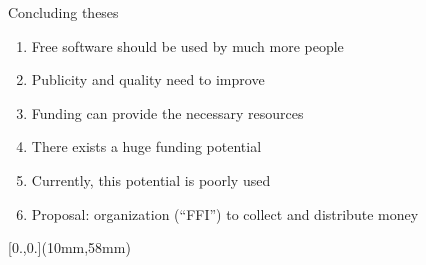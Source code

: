 \documentclass[t]{beamer}
\newcommand{\cst}[1]{{\usebeamercolor[fg]{structure}#1}}
\begin{document}
\begin{frame}[label=zf1]{\cst{Concluding theses}}

\begin{enumerate}
\item<+-> Free software should be used by much more people

\item<+-> Publicity and quality need to improve

\item<+-> Funding can provide the necessary resources

\item<+-> There exists a huge funding potential

\item<+-> Currently, this potential is poorly used

\medskip
\item<+-> Proposal: organization (``FFI'') to collect and distribute money




\end{enumerate}

\begin{textblock*}{\textwidth}[0.,0.](10mm,58mm)
\setlength{\breite}{0.9\textwidth}

\vspace{-22mm}\hspace{5mm}
\begin{center}
\end{center}
\end{textblock*}


\end{frame}
\end{document}
